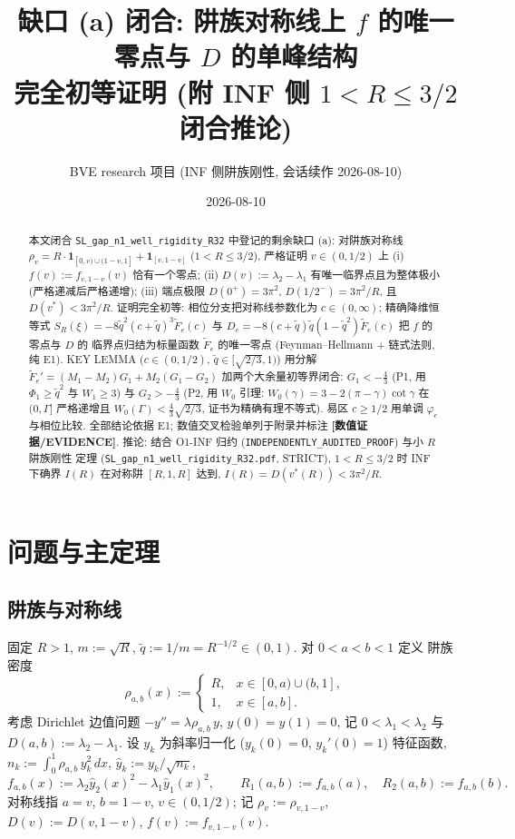 \documentclass[UTF8]{ctexart}
\title{缺口 (a) 闭合: 阱族对称线上 $f$ 的唯一零点与 $D$ 的单峰结构\\
\large 完全初等证明 (附 INF 侧 $1<R\le 3/2$ 闭合推论)}
\author{BVE research 项目 (INF 侧阱族刚性, 会话续作 2026-08-10)}
\date{2026-08-10}
\newcommand{\EVID}{\textbf{[数值证据/EVIDENCE]}}
\begin{document}
\maketitle

\begin{abstract}
本文闭合 \texttt{SL\_gap\_n1\_well\_rigidity\_R32} 中登记的剩余缺口 (a):
对阱族对称线 $\rho_v=R\cdot\mathbf 1_{[0,v)\cup(1-v,1]}+\mathbf 1_{[v,1-v]}$
($1<R\le3/2$), 严格证明 $v\in(0,1/2)$ 上 (i) $f(v):=f_{v,1-v}(v)$ 恰有一个零点;
(ii) $D(v):=\lambda_2-\lambda_1$ 有唯一临界点且为整体极小 (严格递减后严格递增);
(iii) 端点极限 $D(0^+)=3\pi^2$, $D(1/2^-)=3\pi^2/R$, 且 $D(v^*)<3\pi^2/R$.
证明完全初等: 相位分支把对称线参数化为 $c\in(0,\infty)$; 精确降维恒等式
$S_R(\xi)=-8\tilde q^2(c+\tilde q)^3\widetilde F_e(c)$ 与
$D_c=-8(c+\tilde q)\tilde q(1-\tilde q^2)\widetilde F_e(c)$ 把 $f$ 的零点与 $D$ 的
临界点归结为标量函数 $\widetilde F_e$ 的唯一零点 (Feynman--Hellmann + 链式法则, 纯
E1). KEY LEMMA ($c\in(0,1/2)$, $\tilde q\in[\sqrt{2/3},1)$) 用分解
$\widetilde F_e'=(M_1-M_2)G_1+M_2(G_1-G_2)$ 加两个大余量初等界闭合: $G_1<-\frac43$
(P1, 用 $\Phi_1\ge\tilde q^2$ 与 $W_1\ge3$) 与 $G_2>-\frac43$ (P2, 用 $W_0$ 引理:
$W_0(\gamma)=3-2(\pi-\gamma)\cot\gamma$ 在 $(0,\Gamma]$ 严格递增且
$W_0(\Gamma)<\frac43\sqrt{2/3}$, 证书为精确有理不等式). 易区 $c\ge1/2$ 用单调
$\varphi_c$ 与相位比较. 全部结论依据 E1; 数值交叉检验单列于附录并标注 \EVID{}.
推论: 结合 O1-INF 归约 (\texttt{INDEPENDENTLY\_AUDITED\_PROOF}) 与小 $R$ 阱族刚性
定理 (\texttt{SL\_gap\_n1\_well\_rigidity\_R32.pdf}, STRICT), $1<R\le3/2$ 时
INF 下确界 $I(R)$ 在对称阱 $[R,1,R]$ 达到, $I(R)=D(v^*(R))<3\pi^2/R$.
\end{abstract}

\tableofcontents

\section{问题与主定理}

\subsection{阱族与对称线}

固定 $R>1$, $m:=\sqrt R$, $\tilde q:=1/m=R^{-1/2}\in(0,1)$. 对 $0<a<b<1$ 定义
阱族密度
\begin{equation}
	\rho_{a,b}(x):=
	\begin{cases}
		R, & x\in[0,a)\cup(b,1],\\
		1, & x\in[a,b].
	\end{cases}
\end{equation}
考虑 Dirichlet 边值问题 $-y''=\lambda\rho_{a,b}\,y$, $y(0)=y(1)=0$, 记
$0<\lambda_1<\lambda_2$ 与 $D(a,b):=\lambda_2-\lambda_1$. 设 $y_k$ 为斜率归一化
($y_k(0)=0$, $y_k'(0)=1$) 特征函数, $n_k:=\int_0^1\rho_{a,b}\,y_k^2\,dx$,
$\hat y_k:=y_k/\sqrt{n_k}$,
\begin{equation}
	f_{a,b}(x):=\lambda_2\hat y_2(x)^2-\lambda_1\hat y_1(x)^2,
	\qquad R_1(a,b):=f_{a,b}(a),\quad R_2(a,b):=f_{a,b}(b).
	\label{eq:resid}
\end{equation}
对称线指 $a=v$, $b=1-v$, $v\in(0,1/2)$; 记 $\rho_v:=\rho_{v,1-v}$,
$D(v):=D(v,1-v)$, $f(v):=f_{v,1-v}(v)$.
\end{document}
